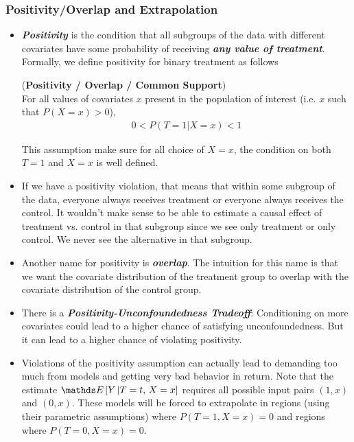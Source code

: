 \documentclass[11pt]{article}
\begin{document}
\subsubsection{Positivity/Overlap and Extrapolation}
\begin{itemize}
\item \emph{\textbf{Positivity}} is the condition that all subgroups of the data with different covariates have some probability of receiving \emph{\textbf{any value of treatment}}. Formally, we define positivity for binary treatment as follows
\begin{assumption} (\textbf{Positivity / Overlap / Common Support})  \citep{neal2020introduction}\\
For all values of covariates $x$ present in the population of interest (i.e. $x$ such that $P(X = x) > 0$),
\begin{align}
0 < P(T=1 | X = x) < 1 \label{eqn: positive}
\end{align}
\end{assumption} This assumption make sure for all choice of $X=x$, the condition on both $T=1$ and $X=x$ is well defined. 

\item If we have a positivity violation, that means that within some subgroup of the data, everyone always receives treatment or everyone always receives the control. It wouldn’t make sense to be able to estimate a causal effect of treatment vs. control in that subgroup since we see only treatment or only control. We never see the alternative in that subgroup.

\item Another name for positivity is \emph{\textbf{overlap}}. The intuition for this name is that we want the covariate distribution of the treatment group to overlap
with the covariate distribution of the control group. 

\item There is a \emph{\textbf{Positivity-Unconfoundedness Tradeoff}}: Conditioning on more covariates could lead to a higher chance of satisfying unconfoundedness. But it can lead to a higher chance of violating positivity. 

\item Violations of the positivity assumption can actually lead to demanding too much from models and getting very bad behavior in return. Note that the estimate $ \E{}{Y \,|T=t, \, X=x}$ requires all possible input pairs $(1, x)$ and $(0,x)$. These models will be forced
to extrapolate in regions (using their parametric assumptions) where $P(T=1, X = x) = 0$ and regions where $P(T=0, X = x) = 0$. 
\end{itemize}
\end{document}
